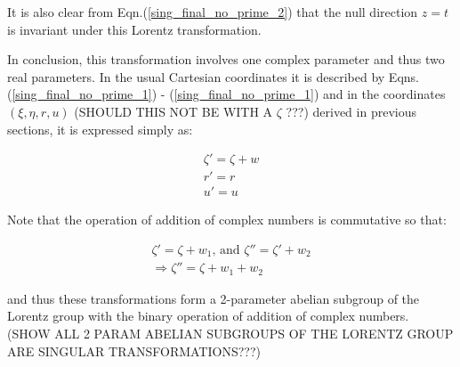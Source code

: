 \noindent It is also clear from Eqn.(\ref{sing_final_no_prime_2}) that the null direction $z = t$ is invariant under this Lorentz transformation.

In conclusion, this transformation involves one complex parameter and thus two real parameters. In the usual Cartesian coordinates it is described by Eqns.(\ref{sing_final_no_prime_1}) - (\ref{sing_final_no_prime_1}) and in the coordinates $(\xi, \eta, r, u)$ (SHOULD THIS NOT BE WITH A $\zeta$ ???) derived in previous sections, it is expressed simply as:

\begin{eqnarray*}
\zeta' = \zeta + w \\
r' = r \\
u' = u
\end{eqnarray*}

Note that the operation of addition of complex numbers is commutative so that:

\begin{eqnarray*} 
\zeta' = \zeta + w_1 \text{, and } \zeta'' = \zeta' + w_2 \\
\Rightarrow \zeta'' = \zeta + w_1 + w_2
\end{eqnarray*} 
 
\noindent and thus these transformations form a 2-parameter abelian subgroup of the Lorentz group with the binary operation of addition of complex numbers. (SHOW ALL 2 PARAM ABELIAN SUBGROUPS OF THE LORENTZ GROUP ARE SINGULAR TRANSFORMATIONS???)







